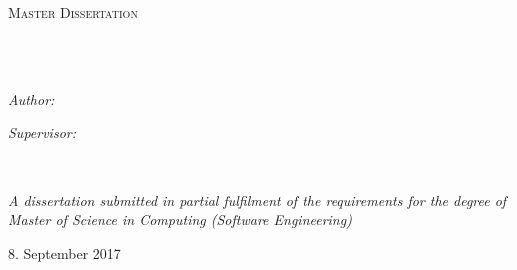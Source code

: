 \begin{titlepage}
\begin{center}

\vspace*{.06\textheight}
{\scshape\LARGE \univname\par}\vspace{1.5cm} %
\textsc{\Large Master Dissertation}\\[0.5cm] %

\HRule \\[0.4cm] %
{\huge \bfseries \ttitle\par}\vspace{0.4cm} %
\HRule \\[1.5cm] %
 
\begin{minipage}[t]{0.4\textwidth}
\begin{flushleft} \large
\emph{Author:}\\
{\authorname} %
\end{flushleft}
\end{minipage}
\begin{minipage}[t]{0.4\textwidth}
\begin{flushright} \large
\emph{Supervisor:} \\
{\supname} %
\end{flushright}
\end{minipage}\\[3cm]
 
\vfill

\large \textit{A dissertation submitted in partial fulfilment 
of the requirements for the degree of \\
Master of Science in Computing (Software Engineering)}\\[0.3cm] %
 
\vfill

{\large 8. September 2017}\\[4cm] %
 
\vfill
\end{center}
\end{titlepage}


